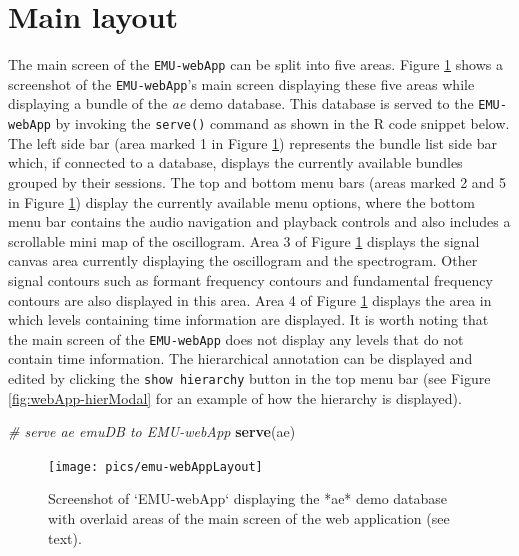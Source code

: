 \documentclass[]{book}
\newenvironment{Shaded}{\begin{snugshade}}{\end{snugshade}}
\newcommand{\CommentTok}[1]{\textcolor[rgb]{0.56,0.35,0.01}{\textit{#1}}}
\newcommand{\KeywordTok}[1]{\textcolor[rgb]{0.13,0.29,0.53}{\textbf{#1}}}
\newcommand{\NormalTok}[1]{#1}
\begin{document}
\hypertarget{sec:emu-webApp-mainLayout}{%
\section{Main layout}\label{sec:emu-webApp-mainLayout}}

The main screen of the \texttt{EMU-webApp} can be split into five areas. Figure \ref{fig:emu-web-emuWebAppLayout} shows a screenshot of the \texttt{EMU-webApp}'s main screen displaying these five areas while displaying a bundle of the \emph{ae} demo database. This database is served to the \texttt{EMU-webApp} by invoking the \texttt{serve()} command as shown in the R code snippet below. The left side bar (area marked 1 in Figure \ref{fig:emu-web-emuWebAppLayout}) represents the bundle list side bar which, if connected to a database, displays the currently available bundles grouped by their sessions. The top and bottom menu bars (areas marked 2 and 5 in Figure \ref{fig:emu-web-emuWebAppLayout}) display the currently available menu options, where the bottom menu bar contains the audio navigation and playback controls and also includes a scrollable mini map of the oscillogram. Area 3 of Figure \ref{fig:emu-web-emuWebAppLayout} displays the signal canvas area currently displaying the oscillogram and the spectrogram. Other signal contours such as formant frequency contours and fundamental frequency contours are also displayed in this area. Area 4 of Figure \ref{fig:emu-web-emuWebAppLayout} displays the area in which levels containing time information are displayed. It is worth noting that the main screen of the \texttt{EMU-webApp} does not display any levels that do not contain time information. The hierarchical annotation can be displayed and edited by clicking the \texttt{show\ hierarchy} button in the top menu bar (see Figure \ref{fig:webApp-hierModal} for an example of how the hierarchy is displayed).

\begin{Shaded}
\begin{Highlighting}[]
\CommentTok{# serve ae emuDB to EMU-webApp}
\KeywordTok{serve}\NormalTok{(ae)}
\end{Highlighting}
\end{Shaded}

\begin{figure}

{\centering \texttt{[image: pics/emu-webAppLayout]} 

}

\caption{Screenshot of `EMU-webApp` displaying the *ae* demo database with overlaid areas of the main screen of the web application (see text).}\label{fig:emu-web-emuWebAppLayout}
\end{figure}
\end{document}
